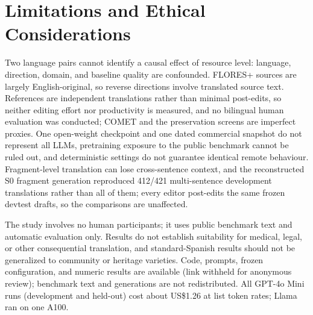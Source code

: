 \section{Limitations and Ethical Considerations}
Two language pairs cannot identify a causal effect of resource level: language, direction, domain, and baseline quality are confounded. FLORES+ sources are largely English-original, so reverse directions involve translated source text. References are independent translations rather than minimal post-edits, so neither editing effort nor productivity is measured, and no bilingual human evaluation was conducted; COMET and the preservation screens are imperfect proxies. One open-weight checkpoint and one dated commercial snapshot do not represent all LLMs, pretraining exposure to the public benchmark cannot be ruled out, and deterministic settings do not guarantee identical remote behaviour. Fragment-level translation can lose cross-sentence context, and the reconstructed S0 fragment generation reproduced 412/421 multi-sentence development translations rather than all of them; every editor post-edits the same frozen devtest drafts, so the comparisons are unaffected.

The study involves no human participants; it uses public benchmark text and automatic evaluation only. Results do not establish suitability for medical, legal, or other consequential translation, and standard-Spanish results should not be generalized to community or heritage varieties. Code, prompts, frozen configuration, and numeric results are available (link withheld for anonymous review); benchmark text and generations are not redistributed. All GPT-4o Mini runs (development and held-out) cost about US\$1.26 at list token rates; Llama ran on one A100.~
